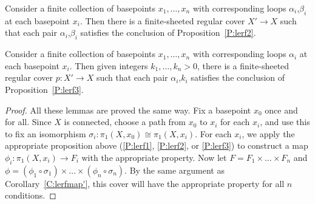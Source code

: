 \begin{prop}\label{P:lerf2'}

Consider a finite collection of basepoints $x_1,\dots,x_n$ with corresponding
loops $\alpha_i$,$\beta_i$ at each basepoint $x_i$. Then there is
a finite-sheeted regular cover $X' \to X$ such that each pair
$\alpha_i$,$\beta_i$ satisfies the conclusion of Proposition~\ref{P:lerf2}.

\end{prop}

\begin{prop}\label{P:lerf3'}

Consider a finite collection of basepoints $x_1,\dots,x_n$ with corresponding
loops $\alpha_i$ at each basepoint $x_i$. Then given integers
$k_1,\dots,k_n>0$, there is a finite-sheeted regular cover $p \colon X' \to X$
such that each pair $\alpha_i$,$k_i$ satisfies the conclusion of
Proposition~\ref{P:lerf3}.

\end{prop}

\begin{proof}

All these lemmas are proved the same way. Fix a basepoint $x_0$ once and for
all.  Since $X$ is connected, choose a path from $x_0$ to $x_i$ for each $x_i$,
and use this to fix an isomorphism $\sigma_i \colon \pi_1(X,x_0) \cong
\pi_1(X,x_i)$.  For each $x_i$, we apply the appropriate proposition above
(\ref{P:lerf1}, \ref{P:lerf2}, or \ref{P:lerf3}) to construct a map $\phi_i
\colon \pi_1(X,x_i) \to F_i$ with the appropriate property. Now let $F = F_1
\times \dots \times F_n$ and $\phi = (\phi_1 \circ \sigma_1) \times \dots
\times (\phi_n \circ \sigma_n)$.  By the same argument as
Corollary~\ref{C:lerfmap'}, this cover will have the appropriate property for
all $n$ conditions.

\end{proof}
